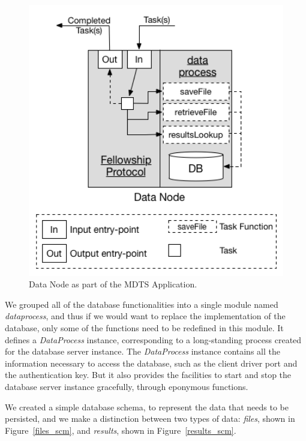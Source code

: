 \documentclass[12pt, titlepage]{uo_temp}
\begin{document}
     \begin{figure}[h!]
       \centering
       \includegraphics[width=125mm]{images/mdts_data.png}
       \caption{Data Node as part of the MDTS Application.}
     \end{figure}

     We grouped all of the database functionalities into a single module named
     \emph{dataprocess}, and thus if we would want to replace the implementation of the
     database, only some of the functions need to be redefined in this module. It defines
     a \emph{DataProcess} instance, corresponding to a long-standing process created for
     the database server instance. The \emph{DataProcess} instance contains all the
     information necessary to access the database, such as the client driver port and the
     authentication key. But it also provides the facilities to start and stop the
     database server instance gracefully, through eponymous functions.

     We created a simple database schema, to represent the data that needs to be
     persisted, and we make a distinction between two types of data: \emph{files}, shown
     in Figure~\ref{files_scm}, and \emph{results}, shown in Figure~\ref{results_scm}.
\end{document}
